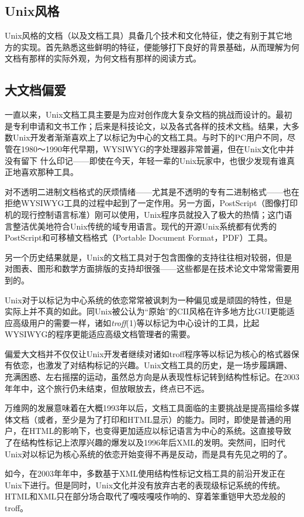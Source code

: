 \documentclass[12pt,oneside]{ctexbook}
\begin{document}
\begin{common-format}
\section{Unix风格}
Unix风格的文档（以及文档工具）具备几个技术和文化特征，使之有别于其它地方的实现。首先熟悉这些鲜明的特征，便能够打下良好的背景基础，从而理解为何文档有那样的实际外观，为何文档有那样的阅读方式。

\subsection{大文档偏爱}
一直以来，Unix文档工具主要是为应对创作庞大复杂文档的挑战而设计的。最初是专利申请和文书工作；后来是科技论文，以及各式各样的技术文档。结果，大多数Unix开发者渐渐喜欢上了以标记为中心的文档工具。与时下的PC用户不同，尽管在1980～1990年代早期，WYSIWYG的字处理器非常普遍，但在Unix文化中并没有留下
什么印记——即使在今天，年轻一辈的Unix玩家中，也很少发现有谁真正地喜欢那种工具。

对不透明二进制文档格式的厌烦情绪——尤其是不透明的专有二进制格式——也在拒绝WYSIWYG工具的过程中起到了一定作用。另一方面，PostScript（图像打印机的现行控制语言标准）刚可以使用，Unix程序员就投入了极大的热情；这门语言整洁优美地符合Unix传统的域专用语言。现代的开源Unix系统都有优秀的PostScript和可移植文档格式（Portable Document Format，PDF）工具。

另一个历史结果就是，Unix的文档工具对于包含图像的支持往往相对较弱，但是对图表、图形和数学方面排版的支持却很强——这些都是在技术论文中常常需要用到的。

Unix对于以标记为中心系统的依恋常常被讽刺为一种偏见或是顽固的特性，但是实际上并不真的如此。同Unix被公认为“原始”的CII风格在许多地方比GUI更能适应高级用户的需要一样，诸如\textit{troff}(1)等以标记为中心设计的工具，比起WYSIWYG的程序更能适应高级文档管理者的需要。

偏爱大文档并不仅仅让Unix开发者继续对诸如troff程序等以标记为核心的格式器保有依恋，也激发了对结构标记的兴趣。Unix文档工具的历史，是一场步履蹒跚、充满困惑、左右摇摆的运动，虽然总方向是从表现性标记转到结构性标记。在2003年年中，这个旅行仍未结束，但放眼放去，终点已不远。

万维网的发展意味着在大概1993年以后，文档工具面临的主要挑战是提高描绘多媒体文档（或者，至少是为了打印和HTML显示）的能力。同时，即使是普通的用户，在HTML的影响下，也变得更加适应以标记语言为中心的系统。这直接导致了在结构性标记上浓厚兴趣的爆发以及1996年后XML的发明。突然间，旧时代Unix对以标记为核心系统的依恋开始变得不再是反动，而是具有先见之明的了。

如今，在2003年年中，多数基于XML使用结构性标记文档工具的前沿开发正在Unix下进行。但是同时，Unix文化并没有放弃古老的表现级标记系统的传统。HTML和XML只在部分场合取代了嘎吱嘎吱作响的、穿着笨重铠甲大恐龙般的troff。


\end{common-format}
\end{document}
